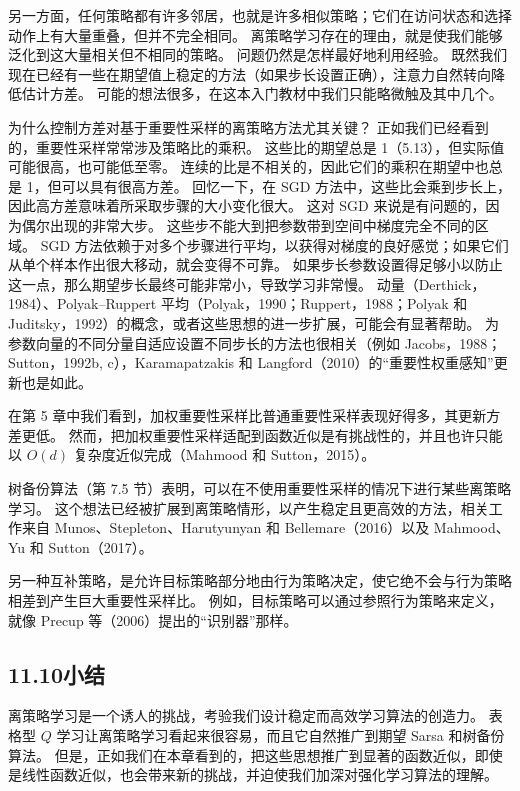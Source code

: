 \documentclass[UTF8,12pt,a4paper,fontset=fandol]{ctexart}
\begin{document}
另一方面，任何策略都有许多邻居，也就是许多相似策略；它们在访问状态和选择动作上有大量重叠，但并不完全相同。
离策略学习存在的理由，就是使我们能够泛化到这大量相关但不相同的策略。
问题仍然是怎样最好地利用经验。
既然我们现在已经有一些在期望值上稳定的方法（如果步长设置正确），注意力自然转向降低估计方差。
可能的想法很多，在这本入门教材中我们只能略微触及其中几个。

为什么控制方差对基于重要性采样的离策略方法尤其关键？
正如我们已经看到的，重要性采样常常涉及策略比的乘积。
这些比的期望总是 1（5.13），但实际值可能很高，也可能低至零。
连续的比是不相关的，因此它们的乘积在期望中也总是 1，但可以具有很高方差。
回忆一下，在 SGD 方法中，这些比会乘到步长上，因此高方差意味着所采取步骤的大小变化很大。
这对 SGD 来说是有问题的，因为偶尔出现的非常大步。
这些步不能大到把参数带到空间中梯度完全不同的区域。
SGD 方法依赖于对多个步骤进行平均，以获得对梯度的良好感觉；如果它们从单个样本作出很大移动，就会变得不可靠。
如果步长参数设置得足够小以防止这一点，那么期望步长最终可能非常小，导致学习非常慢。
动量（Derthick，1984）、Polyak--Ruppert 平均（Polyak，1990；Ruppert，1988；Polyak 和 Juditsky，1992）的概念，或者这些思想的进一步扩展，可能会有显著帮助。
为参数向量的不同分量自适应设置不同步长的方法也很相关（例如 Jacobs，1988；Sutton，1992b, c），Karamapatzakis 和 Langford（2010）的“重要性权重感知”更新也是如此。

在第 5 章中我们看到，加权重要性采样比普通重要性采样表现好得多，其更新方差更低。
然而，把加权重要性采样适配到函数近似是有挑战性的，并且也许只能以 $O(d)$ 复杂度近似完成（Mahmood 和 Sutton，2015）。

树备份算法（第 7.5 节）表明，可以在不使用重要性采样的情况下进行某些离策略学习。
这个想法已经被扩展到离策略情形，以产生稳定且更高效的方法，相关工作来自 Munos、Stepleton、Harutyunyan 和 Bellemare（2016）以及 Mahmood、Yu 和 Sutton（2017）。

另一种互补策略，是允许目标策略部分地由行为策略决定，使它绝不会与行为策略相差到产生巨大重要性采样比。
例如，目标策略可以通过参照行为策略来定义，就像 Precup 等（2006）提出的“识别器”那样。

\subsection*{11.10\quad 小结}

离策略学习是一个诱人的挑战，考验我们设计稳定而高效学习算法的创造力。
表格型 $Q$ 学习让离策略学习看起来很容易，而且它自然推广到期望 Sarsa 和树备份算法。
但是，正如我们在本章看到的，把这些思想推广到显著的函数近似，即使是线性函数近似，也会带来新的挑战，并迫使我们加深对强化学习算法的理解。
\end{document}
